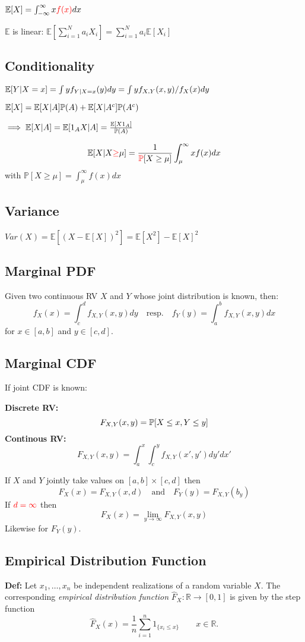 $\mathbb{E}[X] = \int_{-\infty}^\infty x \textcolor{red}{f(x)} dx$

$\mathbb{E}$ is linear: $\mathbb{E}[\sum_{i=1}^N a_i X_i]
= \sum_{i=1}^N a_i \mathbb{E}[X_i]$

\subsection*{Conditionality}

$\mathbb{E}[Y|X=x]=\int y f_{Y|X=x}(y) dy=\int y f_{X,Y}(x,y)/f_X(x) dy$

$\mathbb{E}[X]=\mathbb{E}[X|A]\mathbb{P}(A)+\mathbb{E}[X|A^c]\mathbb{P}(A^c)$

$\implies \mathbb{E}[X|A]=\mathbb{E}[1_A X|A]=\frac{\mathbb{E}[X1_A]}{\mathbb{P}(A)}$

\[
  \mathbb{E}[X|X \textcolor{red}{\geq} \mu] = \frac{1}{\textcolor{red}
  {\mathbb{P}}[X \geq \mu]} \int_\mu^\infty xf(x)dx
\]
with $\mathbb{P}[X\geq\mu] = \int_\mu^\infty f(x)dx$

\subsection*{Variance}
$Var(X) = \mathbb{E}[(X - \mathbb{E}[X])^2]
        = \mathbb{E}[X^2] - \mathbb{E}[X]^2$

\subsection*{Marginal PDF}
Given two continuous RV $X$ and $Y$ whose joint distribution is known, then:
\[
    f_X(x) = \int_c^d f_{X,Y}(x,y) dy \quad \text{resp.} \quad
    f_Y(y) = \int_a^b f_{X,Y}(x,y) dx
\]
for $x\in [a,b]$ and $y \in [c,d]$.

\subsection*{Marginal CDF}
If joint CDF is known:

\textbf{Discrete RV:}
\[
    F_{X,Y}(x,y) = \mathbb{P}[X \leq x, Y \leq y]
\]
\textbf{Continous RV:}
\[
    F_{X,Y}(x,y) = \int_a^x \int_c^y f_{X,Y}(x',y')dy'dx'
\]

If $X$ and $Y$ jointly take values on $[a,b] \times [c,d]$ then
\[
    F_X(x) = F_{X,Y}(x,d) \quad \text{and} \quad F_Y(y) = F_{X,Y}(b_y)
\]
If $\textcolor{red}{d = \infty}$ then
\[
    F_X(x) = \lim_{y \to \infty} F_{X,Y}(x,y)
\]
Likewise for $F_Y(y)$.

\subsection*{Empirical Distribution Function}
\textbf{Def:} Let $x_1, \dots, x_n$ be independent realizations of a random variable $X$. The
corresponding \textit{empirical distribution function} 
$\hat{F}_X : \mathbb{R} \to [0, 1]$ is given by the step function
\[
  \hat{F}_X(x) = \frac{1}{n} \sum_{i=1}^n 1_{\{x_i \leq x\}} \qquad x\in
  \mathbb{R}.
\]

